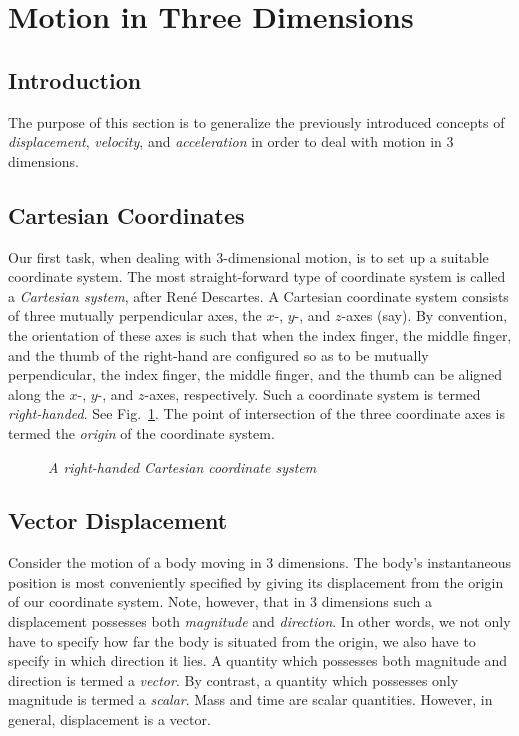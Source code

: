 \section{Motion in Three Dimensions}

\subsection{Introduction}
The purpose of this section is to generalize the previously introduced concepts of {\em displacement},
{\em velocity}, and {\em acceleration} in order to deal with motion in 3
dimensions.

\subsection{Cartesian Coordinates}
Our first task, when dealing with 3-dimensional motion, is to set up a suitable
coordinate system. The most straight-forward type of coordinate system is called a {\em Cartesian
system}, after Ren\'{e} 
Descartes. A Cartesian coordinate system consists of three mutually perpendicular axes,
the $x$-, $y$-, and $z$-axes (say). By convention, the orientation of these
axes is such that when the index finger, the middle finger, and the thumb of the
right-hand are configured so as to be mutually perpendicular,  the index finger, the
middle finger, and the thumb can be aligned along the $x$-, $y$-, and $z$-axes, respectively.
Such a coordinate system is termed {\em right-handed}. See Fig.~\ref{f10}. The
point of intersection of the three coordinate axes is termed the {\em origin}
of the coordinate system.

\begin{figure}[b]
\epsfysize=1.4in
\centerline{}
\caption{\em A right-handed Cartesian coordinate system}\label{f10}   
\end{figure}

\subsection{Vector Displacement}
Consider the motion of a body moving in 3 dimensions. The 
body's instantaneous
position is most conveniently specified by giving its displacement from the origin of our
coordinate system. Note, however, that in 3 dimensions such a displacement possesses both
 {\em magnitude} and  {\em direction}. In other words, we not only have to
 specify how far the body is situated from the origin, we also
have to specify in which direction it lies. A quantity which possesses both
magnitude and direction is termed a {\em vector}. By contrast, a quantity
which possesses only magnitude is termed a {\em scalar}. Mass and time are scalar
quantities. However, in general, displacement is a vector. 

